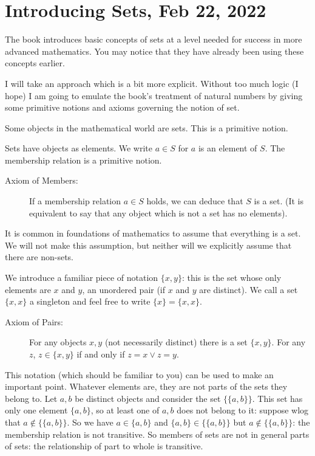 \documentclass[12pt]{article}
\begin{document}
\section{Introducing Sets, Feb 22, 2022}

The book introduces basic concepts of sets at a level needed for success in more advanced mathematics.  You may notice that they have already been using these concepts earlier.

I will take an approach which is a bit more explicit.   Without too much logic (I hope) I am going to emulate the book's treatment of natural numbers by giving some primitive notions and axioms governing the notion of set.

Some objects in the mathematical world are sets.  This is a primitive notion.

Sets have objects as elements.  We write $a \in S$ for $a$ is an element of $S$.  The membership relation is a primitive notion.

\begin{description}

\item[Axiom of Members:]  If a membership relation $a \in S$ holds, we can deduce that $S$ is a set.  (It is equivalent to say that any object which is not a set has no elements).

\end{description}

It is common in foundations of mathematics to assume that everything is a set.  We will not make this assumption, but neither will we explicitly assume that there are non-sets.

We introduce a familiar piece of notation $\{x,y\}$:  this is the set whose only elements are $x$ and $y$, an unordered pair (if $x$ and $y$ are distinct).  We call a set $\{x,x\}$ a singleton and feel free to write $\{x\} = \{x,x\}$.

\begin{description}

\item[Axiom of Pairs:]  For any objects $x,y$ (not necessarily distinct) there is a set $\{x,y\}$.  For any $z$, $z \in \{x,y\}$ if and only if $z=x \vee z=y$.

\end{description}

This notation (which should be familiar to you) can be used to make an important point.  Whatever elements are, they are not parts of the sets they belong to.  Let $a,b$ be distinct objects and consider the set $\{\{a,b\}\}$.  This set has only one element $\{a,b\}$, so at least one of $a,b$ does not belong to it:  suppose wlog that $a \not\in \{\{a,b\}\}$.  So we have $a \in \{a,b\}$ and $\{a,b\} \in \{\{a,b\}\}$ but $a \not\in \{\{a,b\}\}$:  the membership relation is not transitive.  So members of sets are not in general parts of sets:  the relationship of part to whole is transitive.
\end{document}
